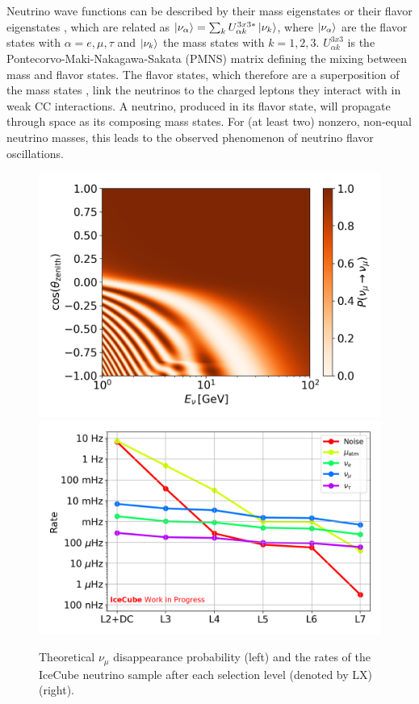 \documentclass[a4paper,11pt]{article}
\begin{document}
Neutrino wave functions can be described by their mass eigenstates or their flavor eigenstates \cite{BILENKY1978225}, which are related as $\ket{\nu_\alpha} = \sum_kU^{3x3*}_{\alpha k}\ket{\nu_k}$, where $\ket{\nu_\alpha}$ are the flavor states with $\alpha=e,\mu,\tau$ and $\ket{\nu_k}$ the mass states with $k=1,2,3$. $U^{3x3}_{\alpha k}$ is the Pontecorvo-Maki-Nakagawa-Sakata (PMNS) matrix defining the mixing between mass and flavor states. The flavor states, which therefore are a superposition of the mass states \cite{PhysRevD.98.030001}, link the neutrinos to the charged leptons they interact with in weak CC interactions. A neutrino, produced in its flavor state, will propagate through space as its composing mass states. For (at least two) nonzero, non-equal neutrino masses, this leads to the observed phenomenon of neutrino flavor oscillations.

\begin{figure}[h!]
  \includegraphics[width=.44\linewidth]{figures/Oscillogram_numu_numu_orange.png}
  \includegraphics[width=.50\linewidth]{figures/OscNext_high_stats_event_selection_levels.png}
  \caption{Theoretical $\nu_{\mu}$ disappearance probability (left) and the rates of the IceCube neutrino sample after each selection level (denoted by LX) (right).}
  \label{fig:oscnext_sample_and_phasespace}
\end{figure}
\end{document}
